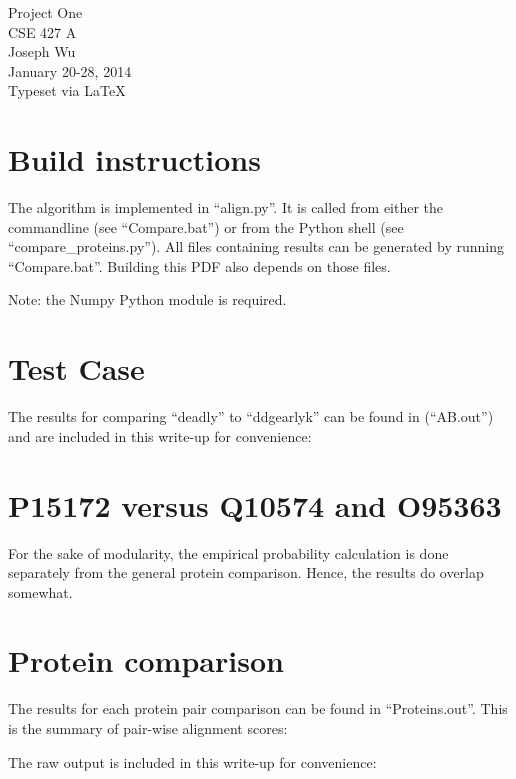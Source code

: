 \documentclass[a4paper, 12pt]{report}
\begin{document}
    \begin{center}
        {\LARGE Project One} \\
        CSE 427 A \\
        Joseph Wu  \\
        January 20-28, 2014 \\
        {\tiny Typeset via \LaTeX}
    \end{center}
    
\section{Build instructions}
    The algorithm is implemented in ``align.py''.  
    It is called from either the commandline (see ``Compare.bat'') 
        or from the Python shell (see ``compare\_proteins.py'').
    All files containing results can be generated by running ``Compare.bat''.
    Building this PDF also depends on those files.
    
    Note: the Numpy Python module is required.
    
\section{Test Case}
    The results for comparing ``deadly'' to ``ddgearlyk'' can be found in (``AB.out'')
    and are included in this write-up for convenience:
    
    
\section{P15172 versus Q10574 and O95363}
    For the sake of modularity, the empirical probability 
        calculation is done separately from the general protein comparison.
        Hence, the results do overlap somewhat.
    
    
    
\section{Protein comparison}
    The results for each protein pair comparison can be found in ``Proteins.out''.
    This is the summary of pair-wise alignment scores:
    
    
    
    The raw output is included in this write-up for convenience:
    
\end{document}
